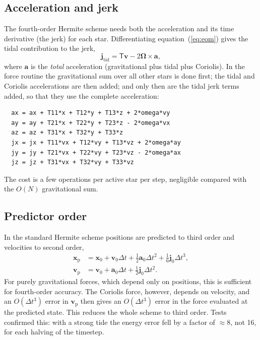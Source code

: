 \documentclass[11pt,a4paper]{article}
\newcommand{\bx}{\mathbf{x}}
\newcommand{\bv}{\mathbf{v}}
\newcommand{\ba}{\mathbf{a}}
\newcommand{\bj}{\mathbf{j}}
\newcommand{\T}{\mathsf{T}}
\newcommand{\bO}{\boldsymbol{\Omega}}
\begin{document}
\subsection{Acceleration and jerk}
The fourth-order Hermite scheme needs both the acceleration and its
time derivative (the jerk) for each star. Differentiating
equation~(\ref{eq:eom}) gives the tidal contribution to the jerk,
\begin{equation}
  \bj_{\mathrm{tid}} = \T\bv - 2\bO\times\ba ,
\end{equation}
where $\ba$ is the \emph{total} acceleration (gravitational plus tidal
plus Coriolis). In the force routine the gravitational sum over all
other stars is done first; the tidal and Coriolis accelerations are
then added; and only then are the tidal jerk terms added, so that they
use the complete acceleration:
\begin{lstlisting}
  ax = ax + T11*x + T12*y + T13*z + 2*omega*vy
  ay = ay + T21*x + T22*y + T23*z - 2*omega*vx
  az = az + T31*x + T32*y + T33*z
  jx = jx + T11*vx + T12*vy + T13*vz + 2*omega*ay
  jy = jy + T21*vx + T22*vy + T23*vz - 2*omega*ax
  jz = jz + T31*vx + T32*vy + T33*vz
\end{lstlisting}
The cost is a few operations per active star per step, negligible
compared with the $O(N)$ gravitational sum.

\subsection{Predictor order}
In the standard Hermite scheme positions are predicted to third order
and velocities to second order,
\begin{align}
  \bx_{\mathrm p} &= \bx_0 + \bv_0\Delta t + \tfrac12\ba_0\Delta t^2
    + \tfrac16\bj_0\Delta t^3, \\
  \bv_{\mathrm p} &= \bv_0 + \ba_0\Delta t + \tfrac12\bj_0\Delta t^2 .
\end{align}
For purely gravitational forces, which depend only on positions, this
is sufficient for fourth-order accuracy. The Coriolis force, however,
depends on velocity, and an $O(\Delta t^3)$ error in $\bv_{\mathrm p}$
then gives an $O(\Delta t^3)$ error in the force evaluated at the
predicted state. This reduces the whole scheme to third order. Tests
confirmed this: with a strong tide the energy error fell by a factor of
$\approx 8$, not 16, for each halving of the timestep.
\end{document}

